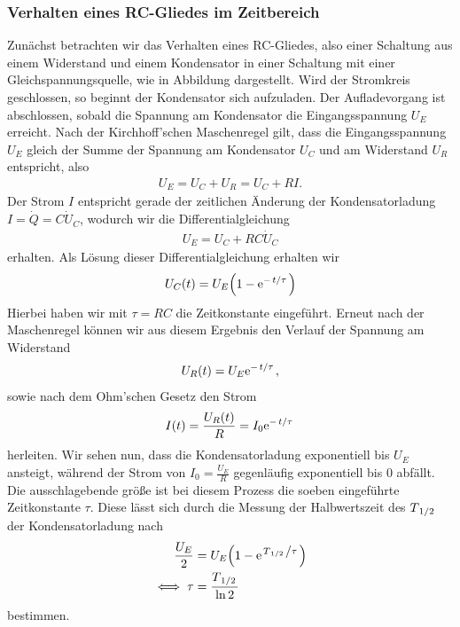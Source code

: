 \subsubsection*{Verhalten eines RC-Gliedes im Zeitbereich}
Zunächst betrachten wir das Verhalten eines RC-Gliedes, also einer Schaltung aus einem Widerstand und einem Kondensator in einer Schaltung mit einer Gleichspannungsquelle, wie in Abbildung  dargestellt. Wird der Stromkreis geschlossen, so beginnt der Kondensator sich aufzuladen. Der Aufladevorgang ist abschlossen, sobald die Spannung am Kondensator die Eingangsspannung $U_E$ erreicht. Nach der Kirchhoff'schen Maschenregel gilt, dass die Eingangsspannung $U_E$ gleich der Summe der Spannung am Kondensator $U_C$ und am Widerstand $U_R$ entspricht, also
\begin{align}
  U_E = U_C + U_R = U_C + R I.
\end{align}
Der Strom $I$ entspricht gerade der zeitlichen Änderung der Kondensatorladung $I = \dot{Q} = C \dot{U}_C$, wodurch wir die Differentialgleichung
\begin{align}
  U_E = U_C + RC \dot{U}_C
\end{align}
erhalten. Als Lösung dieser Differentialgleichung erhalten wir
\begin{align}
  U_C(t) = U_E\qty(1 - \e{-\flatfrac{t}{\tau}})
\end{align}
Hierbei haben wir mit $\tau = RC$ die Zeitkonstante eingeführt. Erneut nach der Maschenregel können wir aus diesem Ergebnis den Verlauf der Spannung am Widerstand
\begin{align}
  U_R(t) = U_E\e{-\flatfrac{t}{\tau}},
\end{align}
sowie nach dem Ohm'schen Gesetz den Strom
\begin{align}
  I(t) = \frac{U_R(t)}{R} = I_0\e{-\flatfrac{t}{\tau}}
\end{align} 
herleiten. Wir sehen nun, dass die Kondensatorladung exponentiell bis $U_E$ ansteigt, während der Strom von $I_0 = \frac{U_E}{R}$ gegenläufig exponentiell bis $0$ abfällt. Die ausschlagebende größe ist bei diesem Prozess die soeben eingeführte Zeitkonstante $\tau$. Diese lässt sich durch die Messung der Halbwertszeit des $T_{\flatfrac{1}{2}}$ der Kondensatorladung nach 
\begin{align}
  \frac{U_E}{2} &= U_E\qty(1 - \e{\flatfrac{T_{\ffrac{1}{2}}}{\tau}})\\
  \iff \tau &= \frac{\Thalf}{\ln 2}
\end{align}
bestimmen.

